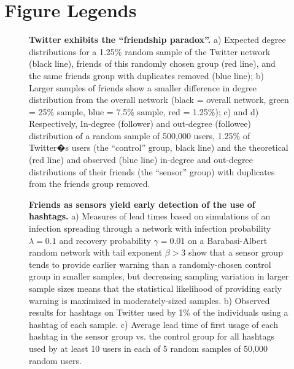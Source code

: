 %
\section*{Figure Legends}
\begin{figure}[ht]
\begin{center}
\end{center}
\caption{
{\bf Twitter exhibits the ``friendship paradox''.} a) Expected degree distributions for a 1.25\% random sample of the Twitter network (black line), friends of this randomly chosen group (red line), and the same friends group with duplicates removed (blue line); b) Larger samples of friends show a smaller difference in degree distribution from the overall network (black = overall network, green = 25\% sample, blue = 7.5\% sample, red = 1.25\%); c) and d) Respectively, In-degree (follower) and out-degree (followee) distribution of a random sample of 500,000 users, 1.25\% of Twitter�s users (the ``control'' group, black line) and the theoretical (red line) and observed (blue line) in-degree and out-degree distributions of their friends (the ``sensor'' group) with duplicates from the friends group removed.
}
\label{panel1}
\end{figure}

\begin{figure}[ht]
\begin{center}
\end{center}
\caption{
{\bf Friends as sensors yield early detection of the use of hashtags.}  a) Measures of lead times based on simulations of an infection spreading through a network with infection probability $\lambda=0.1$ and recovery probability $\gamma=0.01$ on a Barabasi-Albert random network with tail exponent $\beta>3$ show that a sensor group tends to provide earlier warning than a randomly-chosen control group in smaller samples, but decreasing sampling variation in larger sample sizes means that the statistical likelihood of providing early warning is maximized in moderately-sized samples.  b) Observed results for hashtags on Twitter used by 1\% of the individuals using a hashtag of each sample.  c) Average lead time of first usage of each hashtag in the sensor group vs. the control group for all hashtags used by at least 10 users in each of 5 random samples of 50,000 random users.
}
\label{panel2}
\end{figure}

